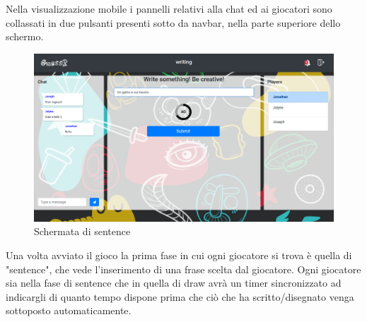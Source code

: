\noindent Nella visualizzazione mobile i pannelli relativi alla chat ed ai giocatori sono collassati in due pulsanti presenti sotto da navbar, nella parte superiore dello schermo.


\begin{figure}[H]
    \centering
    \includegraphics[width=0.8\linewidth]{img/screen/sentence (1).png}
    \caption{Schermata di sentence} 
\end{figure}

\noindent Una volta avviato il gioco la prima fase in cui ogni giocatore si trova è quella di "sentence", che vede l'inserimento di una frase scelta dal giocatore. Ogni giocatore sia nella fase di sentence che in quella di draw avrà un timer sincronizzato ad indicargli di quanto tempo dispone prima che ciò che ha scritto/disegnato venga sottoposto automaticamente.

